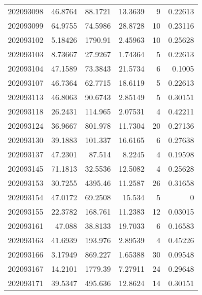 \begin{tabular}{rrrrrr}
 202093098 &         46.8764  &       88.1721 &           13.3639  &           9 & 0.22613 \\
 202093099 &         64.9755  &       74.5986 &           28.8728  &          10 & 0.23116 \\
 202093102 &          5.18426 &     1790.91   &            2.45963 &          10 & 0.25628 \\
 202093103 &          8.73667 &       27.9267 &            1.74364 &           5 & 0.22613 \\
 202093104 &         47.1589  &       73.3843 &           21.5734  &           6 & 0.1005  \\
 202093107 &         46.7364  &       62.7715 &           18.6119  &           5 & 0.22613 \\
 202093113 &         46.8063  &       90.6743 &            2.85149 &           5 & 0.30151 \\
 202093118 &         26.2431  &      114.965  &            2.07531 &           4 & 0.42211 \\
 202093124 &         36.9667  &      801.978  &           11.7304  &          20 & 0.27136 \\
 202093130 &         39.1883  &      101.337  &           16.6165  &           6 & 0.27638 \\
 202093137 &         47.2301  &       87.514  &            8.2245  &           4 & 0.19598 \\
 202093145 &         71.1813  &       32.5536 &           12.5082  &           4 & 0.25628 \\
 202093153 &         30.7255  &     4395.46   &           11.2587  &          26 & 0.31658 \\
 202093154 &         47.0172  &       69.2508 &           15.534   &           5 & 0       \\
 202093155 &         22.3782  &      168.761  &           11.2383  &          12 & 0.03015 \\
 202093161 &         47.088   &       38.8133 &           19.7033  &           6 & 0.16583 \\
 202093163 &         41.6939  &      193.976  &            2.89539 &           4 & 0.45226 \\
 202093166 &          3.17949 &      869.227  &            1.65388 &          30 & 0.09548 \\
 202093167 &         14.2101  &     1779.39   &            7.27911 &          24 & 0.29648 \\
 202093171 &         39.5347  &      495.636  &           12.8624  &          14 & 0.30151 \\

\end{tabular}
